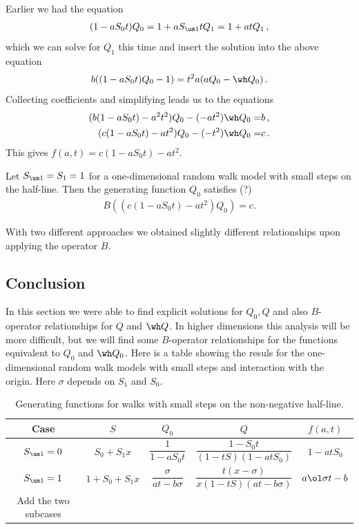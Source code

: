 Earlier we had the equation
\begin{align}
	(1-aS_0t)Q_0 = 1 + a S_{\um 1} t Q_1 = 1 + at Q_1\,,
\end{align}
which we can solve for $Q_1$ this time and insert the solution into the above equation
\begin{align}
	b ((1-aS_0t)Q_0-1) = t^2 a (aQ_0 - \wh Q_0)\,.
\end{align}
Collecting coefficients and simplifying leads us to the equations
\begin{align}
\begin{split}
	(b(1-aS_0t)-a^2 t^2) Q_0 -(-at^2)\wh Q_0 =& b\,,\\
	(c(1-aS_0t)-a t^2) Q_0 -(-t^2)\wh Q_0 =& c\,.
\end{split}
\end{align}
This gives $f(a,t) = c(1-aS_0t)-a t^2$.
\begin{prop} Let $S_{\um 1} = S_1 = 1$ for a one-dimensional random walk model with small steps on the half-line. Then the generating function $Q_0$ satisfies (?)
\begin{align}
	B((c(1-aS_0t)-a t^2)Q_0) = c.
\end{align}
\end{prop}
With two different approaches we obtained slightly different relationships upon applying the operator $B$.
\subsection{Conclusion}
In this section we were able to find explicit solutions for $Q_0, Q$ and also $B$-operator relationships for $Q$ and $\wh Q$. In higher dimensions this analysis will be more difficult, but we will find some $B$-operator relationships for the functions equivalent to $Q_0$ and $\wh Q_0$. Here is a table showing the resuls for the one-dimensional random walk models with small steps and interaction with the origin. Here $\sigma$ depends on $S_1$ and $S_0$.
 \begin{table}[H]
    \caption{Generating functions for walks with small steps on the non-negative half-line.}
    \label{tbl:table1d}
    \centering
    \begin{tabular}{ccccc}
    \toprule
    Case & $S$ & $Q_0$ & $Q$ & $f(a,t)$\\
    \midrule
    $S_{\um 1} = 0$ & $S_0 + S_1 x$ & $\dfrac{1}{1- a S_0t}$ & $\dfrac{1-S_0 t}{(1-tS)(1-atS_0)}$ & $1-atS_0 $ \\
    $S_{\um 1} = 1$ & $1+S_0+S_1 x$ & $\dfrac{\sigma}{at - b\sigma}$ & $\dfrac{t(x- \sigma)}{x(1-tS)(at-b\sigma)}$ & $a\ol \sigma t-b$\\
    Add the two subcases &&&&\\
    \bottomrule
    \end{tabular}
\end{table}

\endinput
